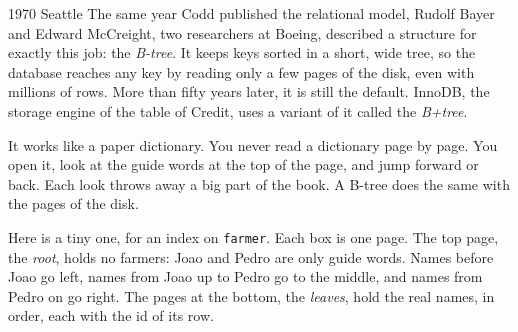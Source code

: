 \begin{history}{1970 \textperiodcentered{} Seattle}
The same year Codd published the relational model, Rudolf Bayer and Edward
McCreight, two researchers at Boeing, described a structure for exactly this
job: the \emph{B-tree}. It keeps keys sorted in a short, wide tree, so the
database reaches any key by reading only a few pages of the disk, even with
millions of rows. More than fifty years later, it is still the default.
InnoDB, the storage engine of the table of Credit, uses a variant of it
called the \emph{B+tree}.

It works like a paper dictionary. You never read a dictionary page by page.
You open it, look at the guide words at the top of the page, and jump forward
or back. Each look throws away a big part of the book. A B-tree does the same
with the pages of the disk.

Here is a tiny one, for an index on \texttt{farmer}. Each box is one page.
The top page, the \emph{root}, holds no farmers: Joao and Pedro are only
guide words. Names before Joao go left, names from Joao up to Pedro go to the
middle, and names from Pedro on go right. The pages at the bottom, the
\emph{leaves}, hold the real names, in order, each with the id of its row.


\end{history}
